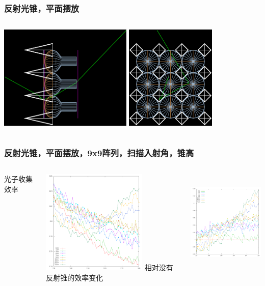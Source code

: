 \begin{frame}
    \frametitle{反射光锥，平面摆放}
    \begin{columns}
        \column{5.0cm} 
            \includegraphics[height=5cm, keepaspectratio]{data/OptTrd_0.eps}
        \column{5.0cm} 
            \includegraphics[height=5cm, keepaspectratio]{data/OptTrd_1.eps}
    \end{columns}
\end{frame}

\begin{frame}
    \frametitle{反射光锥，平面摆放，9x9阵列，扫描入射角，锥高}
    \begin{columns}
        \column{5.0cm} 
            光子收集效率

            \includegraphics[height=5cm, keepaspectratio]{data/opttrd_incient_theta.png}
        \column{5.0cm} 
            相对没有反射锥的效率变化

            \includegraphics[height=5cm, keepaspectratio]{data/opttrd_incient_theta_rel.png}
    \end{columns}
\end{frame}

